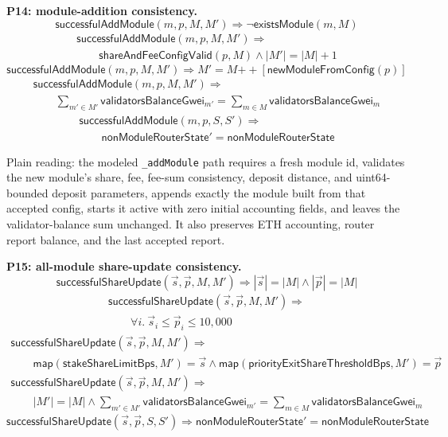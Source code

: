 \medskip
\noindent\textbf{P14: module-addition consistency.}
\[
  \mathsf{successfulAddModule}(m,p,M,M')
  \Rightarrow
  \neg\mathsf{existsModule}(m,M)
\]
\[
  \begin{array}{l}
  \mathsf{successfulAddModule}(m,p,M,M')
  \Rightarrow \\
  \qquad
  \mathsf{shareAndFeeConfigValid}(p,M)
  \land |M'|=|M|+1
  \end{array}
\]
\[
  \mathsf{successfulAddModule}(m,p,M,M')
  \Rightarrow
  M' = M \mathbin{++} [\mathsf{newModuleFromConfig}(p)]
\]
\[
  \begin{array}{l}
  \mathsf{successfulAddModule}(m,p,M,M')
  \Rightarrow \\
  \qquad
  \sum_{m'\in M'} \mathsf{validatorsBalanceGwei}_{m'}
  =
  \sum_{m\in M} \mathsf{validatorsBalanceGwei}_m
  \end{array}
\]
\[
  \begin{array}{l}
  \mathsf{successfulAddModule}(m,p,S,S')
  \Rightarrow \\
  \qquad
  \mathsf{nonModuleRouterState}' = \mathsf{nonModuleRouterState}
  \end{array}
\]

\noindent Plain reading: the modeled \texttt{\_addModule} path requires a fresh
module id, validates the new module's share, fee, fee-sum consistency, deposit
distance, and uint64-bounded deposit parameters, appends exactly the module
built from that accepted config, starts it active with zero initial accounting
fields, and leaves the validator-balance sum unchanged. It also preserves ETH
accounting, router report balance, and the last accepted report.

\medskip
\noindent\textbf{P15: all-module share-update consistency.}
\[
  \mathsf{successfulShareUpdate}(\vec{s},\vec{p},M,M')
  \Rightarrow
  |\vec{s}|=|M| \land |\vec{p}|=|M|
\]
\[
  \begin{array}{l}
  \mathsf{successfulShareUpdate}(\vec{s},\vec{p},M,M')
  \Rightarrow \\
  \qquad
  \forall i.\ \vec{s}_i \leq \vec{p}_i \leq 10{,}000
  \end{array}
\]
\[
  \begin{array}{l}
  \mathsf{successfulShareUpdate}(\vec{s},\vec{p},M,M')
  \Rightarrow \\
  \qquad
  \mathsf{map}(\mathsf{stakeShareLimitBps},M')=\vec{s}
  \land
  \mathsf{map}(\mathsf{priorityExitShareThresholdBps},M')=\vec{p}
  \end{array}
\]
\[
  \begin{array}{l}
  \mathsf{successfulShareUpdate}(\vec{s},\vec{p},M,M')
  \Rightarrow \\
  \qquad
  |M'|=|M|
  \land
  \sum_{m'\in M'} \mathsf{validatorsBalanceGwei}_{m'}
  =
  \sum_{m\in M} \mathsf{validatorsBalanceGwei}_m
  \end{array}
\]
\[
  \mathsf{successfulShareUpdate}(\vec{s},\vec{p},S,S')
  \Rightarrow
  \mathsf{nonModuleRouterState}' = \mathsf{nonModuleRouterState}
\]

